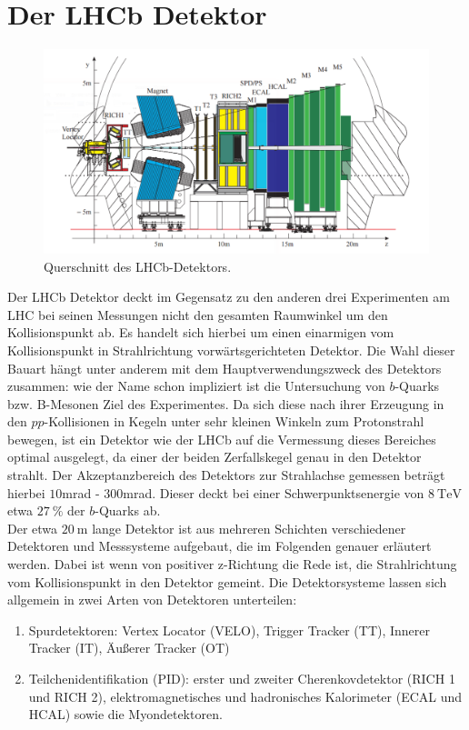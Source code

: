 \section{Der LHCb Detektor}
%
\begin{figure}[H]
  \centering
      \includegraphics[width=\textwidth]{Plots/lhcb.pdf}
  \caption{Querschnitt des LHCb-Detektors.\cite{lhcb}}
  \label{fig:lhcb}
\end{figure}
%
Der LHCb Detektor deckt im Gegensatz zu den anderen drei Experimenten am LHC bei seinen Messungen nicht den gesamten Raumwinkel um den Kollisionspunkt ab. Es handelt sich hierbei um einen einarmigen vom Kollisionspunkt in Strahlrichtung vorwärtsgerichteten Detektor. Die Wahl dieser Bauart hängt unter anderem mit dem Hauptverwendungszweck des Detektors zusammen: wie der Name schon impliziert ist die Untersuchung von $b$-Quarks bzw. B-Mesonen Ziel des Experimentes. Da sich diese nach ihrer Erzeugung in den $pp$-Kollisionen in Kegeln unter sehr kleinen Winkeln zum Protonstrahl bewegen, ist ein Detektor wie der LHCb auf die Vermessung dieses Bereiches optimal ausgelegt, da einer der beiden Zerfallskegel genau in den Detektor strahlt. Der Akzeptanzbereich des Detektors zur Strahlachse gemessen beträgt hierbei $10$mrad - $300$mrad. Dieser deckt bei einer Schwerpunktsenergie von $\SI{8}{\tera\electronvolt}$ etwa $\SI{27}{\percent}$ der $b$-Quarks ab\cite{rad}.\\
%
Der etwa $\SI{20}{\meter}$ lange Detektor ist aus mehreren Schichten verschiedener Detektoren und Messsysteme aufgebaut, die im Folgenden genauer erläutert werden. Dabei ist wenn von positiver z-Richtung die Rede ist, die Strahlrichtung vom Kollisionspunkt in den Detektor gemeint. Die Detektorsysteme lassen sich allgemein in zwei Arten von Detektoren unterteilen:
%
\begin{enumerate}
  \item Spurdetektoren: Vertex Locator (VELO), Trigger Tracker (TT), Innerer Tracker (IT), Äußerer Tracker (OT)
  \item Teilchenidentifikation (PID): erster und zweiter Cherenkovdetektor (RICH 1 und RICH 2), elektromagnetisches und hadronisches Kalorimeter (ECAL und HCAL) sowie die Myondetektoren.
\end{enumerate}
